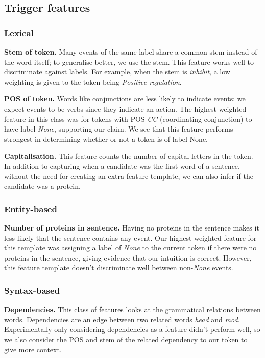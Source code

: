 \documentclass{article} %
\begin{document}
\subsection{Trigger features}

\subsubsection{Lexical}

\textbf{Stem of token.} Many events of the same label share a common stem instead of the word itself; to generalise better, we use the stem.
This feature works well to discriminate against labels. For example, when the stem is \emph{inhibit}, a low weighting is given to the token being \emph{Positive regulation}.


\textbf{POS of token.} \cite{1} Words like conjunctions are less likely to indicate events; we expect events to be verbs since they indicate an action. The highest weighted feature in this class was for tokens with POS \emph{CC} (coordinating conjunction) to have label \emph{None}, supporting our claim. 
We see that this feature performs strongest in determining whether or not a token is of label None.

\textbf{Capitalisation.} \cite{1} This feature counts the number of capital letters in the token. In addition to capturing when a candidate was the first word of a sentence, without the need for creating an extra feature template, we can also infer if the candidate was a protein.

\subsubsection{Entity-based}

\textbf{Number of proteins in sentence.} Having no proteins in the sentence makes it less likely that the sentence contains any event. Our highest weighted feature for this template was assigning a label of \emph{None} to the current token if there were no proteins in the sentence, giving evidence that our intuition is correct. However, this feature template doesn't discriminate well between non-\emph{None} events.

\subsubsection{Syntax-based}

\textbf{Dependencies.} \cite{4} This class of features looks at the grammatical relations between words. Dependencies are an edge between two related words \emph{head} and \emph{mod}. Experimentally only considering dependencies as a feature didn't perform well, so we also consider the POS and stem of the related dependency to our token to give more context. 
\end{document}
